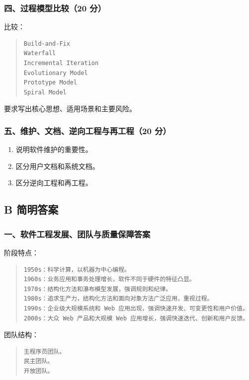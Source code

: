 \documentclass[UTF8,zihao=-4]{ctexart}
\begin{document}
\subsubsection*{四、过程模型比较（20 分）}


比较：


\begin{quote}
\footnotesize
\begin{verbatim}
Build-and-Fix
Waterfall
Incremental Iteration
Evolutionary Model
Prototype Model
Spiral Model
\end{verbatim}
\end{quote}


要求写出核心思想、适用场景和主要风险。


\subsubsection*{五、维护、文档、逆向工程与再工程（20 分）}


\begin{enumerate}
\item 说明软件维护的重要性。
\item 区分用户文档和系统文档。
\item 区分逆向工程和再工程。
\end{enumerate}


\subsection{B 简明答案}


\subsubsection*{一、软件工程发展、团队与质量保障答案}


阶段特点：


\begin{quote}
\footnotesize
\begin{verbatim}
1950s：科学计算，以机器为中心编程。
1960s：业务应用和事务处理增长，软件不同于硬件的特征凸显。
1970s：结构化方法和瀑布模型发展，强调规则和纪律。
1980s：追求生产力，结构化方法和面向对象方法广泛应用，重视过程。
1990s：企业级大规模系统和 Web 应用出现，强调快速开发、可变更性和用户价值。
2000s：大众 Web 产品和大规模 Web 应用增长，强调快速迭代、创新和用户反馈。
\end{verbatim}
\end{quote}


团队结构：


\begin{quote}
\footnotesize
\begin{verbatim}
主程序员团队。
民主团队。
开放团队。
\end{verbatim}
\end{quote}
\end{document}
